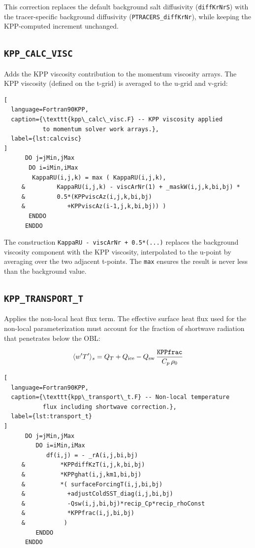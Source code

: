 \documentclass[12pt,letterpaper]{article}
\begin{document}
This correction replaces the default background salt diffusivity  
(\texttt{diffKrNrS}) with the tracer-specific background diffusivity  
(\texttt{PTRACERS\_diffKrNr}), while keeping the KPP-computed  
increment unchanged.  
  
\subsection{\texttt{KPP\_CALC\_VISC}}  
  
Adds the KPP viscosity contribution to the momentum viscosity arrays.  
The KPP viscosity (defined on the t-grid) is averaged to the u-grid  
and v-grid:  
  
\begin{lstlisting}[  
  language=Fortran90KPP,  
  caption={\texttt{kpp\_calc\_visc.F} -- KPP viscosity applied  
           to momentum solver work arrays.},  
  label={lst:calcvisc}  
]  
      DO j=jMin,jMax  
       DO i=iMin,iMax  
        KappaRU(i,j,k) = max ( KappaRU(i,j,k),  
     &         KappaRU(i,j,k) - viscArNr(1) + _maskW(i,j,k,bi,bj) *  
     &         0.5*(KPPviscAz(i,j,k,bi,bj)  
     &            +KPPviscAz(i-1,j,k,bi,bj)) )  
       ENDDO  
      ENDDO  
\end{lstlisting}  
  
The construction \texttt{KappaRU - viscArNr + 0.5*(...)} replaces the  
background viscosity component with the KPP viscosity, interpolated  
to the u-point by averaging over the two adjacent t-points. The  
\texttt{max} ensures the result is never less than the background value.  
  
\subsection{\texttt{KPP\_TRANSPORT\_T}}  
  
Applies the non-local heat flux term. The effective surface heat flux  
used for the non-local parameterization must account for the fraction  
of shortwave radiation that penetrates below the OBL:  
  
\begin{equation}  
\langle w'T'\rangle_s = Q_T + Q_{\rm ice} - Q_{\rm sw}\,  
\frac{\texttt{KPPfrac}}{C_p\,\rho_0}  
\end{equation}  
  
\begin{lstlisting}[  
  language=Fortran90KPP,  
  caption={\texttt{kpp\_transport\_t.F} -- Non-local temperature  
           flux including shortwave correction.},  
  label={lst:transport_t}  
]  
      DO j=jMin,jMax  
         DO i=iMin,iMax  
            df(i,j) = - _rA(i,j,bi,bj)  
     &          *KPPdiffKzT(i,j,k,bi,bj)  
     &          *KPPghat(i,j,km1,bi,bj)  
     &          *( surfaceForcingT(i,j,bi,bj)  
     &            +adjustColdSST_diag(i,j,bi,bj)  
     &            -Qsw(i,j,bi,bj)*recip_Cp*recip_rhoConst  
     &            *KPPfrac(i,j,bi,bj)  
     &           )  
         ENDDO  
      ENDDO  
\end{lstlisting}  
  
\end{document}
